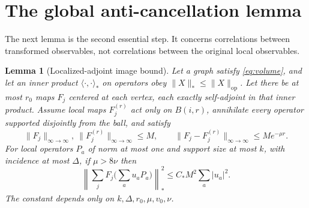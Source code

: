 \documentclass[11pt]{article}
\newtheorem{lemma}[theorem]{Lemma}
\theoremstyle{remark}\newtheorem{remark}[theorem]{Remark}
\newcommand{\op}[1]{\|#1\|_{\mathrm{op}}}
\begin{document}
\section{The global anti-cancellation lemma}
The next lemma is the second essential step. It concerns correlations between transformed observables, not correlations between the original local observables.

\begin{lemma}[Localized-adjoint image bound]\label{lem:bessel}
Let a graph satisfy \eqref{eq:volume}, and let an inner product $\langle\cdot,\cdot\rangle_*$ on operators obey $\|X\|_*\le\op X$. Let there be at most $r_0$ maps $F_j$ centered at each vertex, each exactly self-adjoint in that inner product. Assume local maps $F_j^{(r)}$ act only on $B(i,r)$, annihilate every operator supported disjointly from the ball, and satisfy
\[
 \|F_j\|_{\infty\to\infty},\ \|F_j^{(r)}\|_{\infty\to\infty}\le M,
 \qquad\|F_j-F_j^{(r)}\|_{\infty\to\infty}\le Me^{-\mu r}.
\]
For local operators $P_a$ of norm at most one and support size at most $k$, with incidence at most $\Delta$, if $\mu>8\nu$ then
\begin{equation}\label{eq:bessel}
 \left\|\sum_j F_j\Big(\sum_a u_aP_a\Big)\right\|_*^2
 \le C_*M^2\sum_a|u_a|^2.
\end{equation}
The constant depends only on $k,\Delta,r_0,\mu,v_0,\nu$.
\end{lemma}
\end{document}
